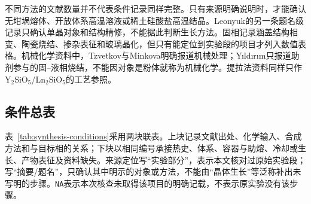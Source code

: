 不同方法的文献数量并不代表条件记录同样完整。只有来源明确说明时，才能确认无坩埚熔体、开放体系高温溶液或稀土硅酸盐高温结晶\cite{christensen1994investigation,ababaikeri2024ba3zn4si4o15,leonyuk1999high,giess1982zn2sio4}。Leonyuk的另一条题名级记录只确认单晶对象和结构精修，不能据此判断生长方法\cite{leonyuk1999crystal}。固相记录涵盖结构相变、陶瓷烧结、掺杂表征和玻璃晶化，但只有能定位到实验段的项目才列入数值表格\cite{lin1999phase,zou2021crystal,kerstan2012thermal,cai2024optimized,zhao2026crystal,tejas2024structural,pires2001luminescence,kerstan2015kristallphasen}。机械化学资料中，Tzvetkov与Minkova明确报道机械处理；Yıldırım只报道助剂参与的固--液相烧结，不能因对象是粉体就称为机械化学\cite{tzvetkov2001effects,yldrm2009y2sio5}。提拉法资料同样只作Y$_2$SiO$_5$/Ln$_2$SiO$_5$的工艺参照\cite{pang2005study,alizadeh2021spectroscopy,shoudu1999czochralski,brandle1986czochralski}。

\subsection{条件总表}

表~\ref{tab:synthesis-conditions}采用两块联表。上块记录文献出处、化学输入、合成方法和与目标相的关系；下块以相同编号承接热史、体系、容器与助熔、冷却或生长、产物表征及资料缺失。来源定位写“实验部分”，表示本文核对过原始实验段；写“摘要/题名”，只确认其中明示的对象或方法，不能由“晶体生长”等泛称补出未写明的步骤。\texttt{NA}表示本次核查未取得该项目的明确记载，不表示原实验没有该步骤。

